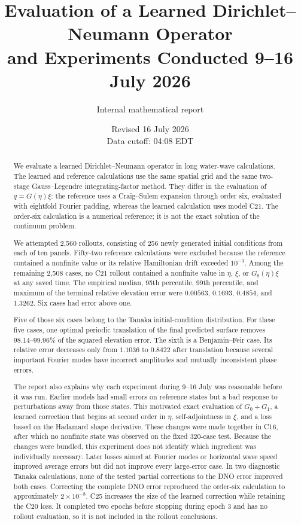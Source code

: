 \documentclass[11pt]{article}
\title{Evaluation of a Learned Dirichlet--Neumann Operator\\
and Experiments Conducted 9--16 July 2026}
\author{Internal mathematical report}
\date{Revised 16 July 2026\\Data cutoff: 04:08 EDT}
\begin{document}
\maketitle

\begin{abstract}
We evaluate a learned Dirichlet--Neumann operator in long water-wave
calculations.  The learned and reference calculations use the same spatial
grid and the same two-stage Gauss--Legendre integrating-factor method.  They
differ in the evaluation of $q=G(\eta)\xi$: the reference uses a Craig--Sulem
expansion through order six, evaluated with eightfold Fourier padding, whereas
the learned calculation uses model C21.  The order-six calculation is a
numerical reference; it is not the exact solution of the continuum problem.

We attempted 2,560 rollouts, consisting of 256 newly generated initial
conditions from each of ten panels.  Fifty-two reference calculations were
excluded because the reference contained a nonfinite value or its relative
Hamiltonian drift exceeded $10^{-3}$.  Among the remaining 2,508 cases, no C21
rollout contained a nonfinite value in $\eta$, $\xi$, or $G_\theta(\eta)\xi$ at
any saved time.  The empirical median, 95th percentile, 99th percentile, and
maximum of the terminal relative elevation error were
$0.00563$, $0.1693$, $0.4854$, and $1.3262$.  Six cases had error above one.

Five of those six cases belong to the Tanaka initial-condition distribution.
For these five cases, one optimal periodic translation of the final predicted
surface removes 98.14--99.96\% of the squared elevation error.  The sixth is a
Benjamin--Feir case.  Its relative error decreases only from $1.1036$ to
$0.8422$ after translation because several important Fourier modes have
incorrect amplitudes and mutually inconsistent phase errors.

The report also explains why each experiment during 9--16 July was reasonable
before it was run.  Earlier models had small errors on reference states but a
bad response to perturbations away from those states.  This motivated exact
evaluation of $G_0+G_1$, a learned correction that begins at second order in
$\eta$, self-adjointness in $\xi$, and a loss based on the Hadamard shape
derivative.  These changes were made together in C16, after which no nonfinite
state was observed on the fixed 320-case test.  Because the changes were
bundled, this experiment does not identify which ingredient was individually
necessary.  Later losses aimed at Fourier modes or horizontal wave speed
improved average errors but did not improve every large-error case.  In two
diagnostic Tanaka calculations, none of the tested partial corrections to the
DNO error improved both cases.  Correcting the complete DNO error reproduced
the order-six calculation to approximately $2\times10^{-8}$.  C25 increases
the size of the learned correction while retaining the C20 loss.  It completed
two epochs before stopping during epoch 3 and has no rollout evaluation, so it
is not included in the rollout conclusions.
\end{abstract}
\end{document}
